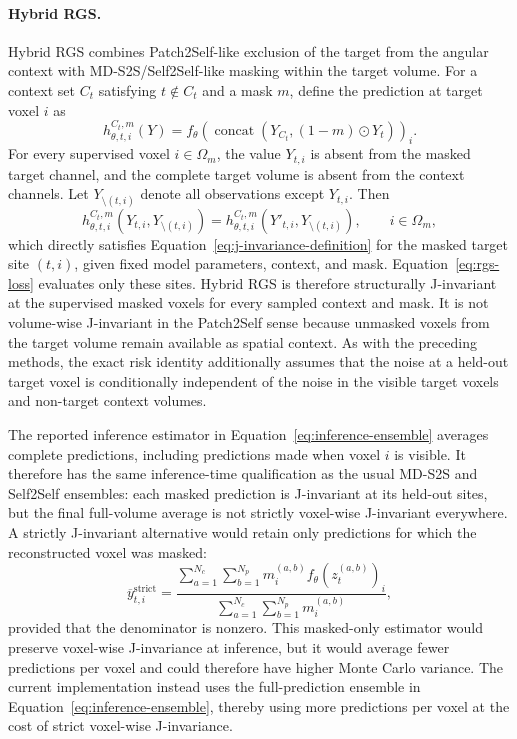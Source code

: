 \documentclass[preprint,12pt]{elsarticle}
\begin{document}
\paragraph{Hybrid RGS.}
Hybrid RGS combines Patch2Self-like exclusion of the target from the angular context with MD-S2S/Self2Self-like masking within the target volume. For a context set $C_t$ satisfying $t\notin C_t$ and a mask $m$, define the prediction at target voxel $i$ as
\begin{equation}
  h_{\theta,t,i}^{C_t,m}(Y)
  =
  f_\theta\!\left(
    \operatorname{concat}\!\left(Y_{C_t},(1-m)\odot Y_t\right)
  \right)_i.
  \label{eq:hybrid-site-prediction}
\end{equation}
For every supervised voxel $i\in\Omega_m$, the value $Y_{t,i}$ is absent from the masked target channel, and the complete target volume is absent from the context channels. Let $Y_{\setminus(t,i)}$ denote all observations except $Y_{t,i}$. Then
\begin{equation}
  h_{\theta,t,i}^{C_t,m}(Y_{t,i},Y_{\setminus(t,i)})
  =
  h_{\theta,t,i}^{C_t,m}(Y'_{t,i},Y_{\setminus(t,i)}),
  \qquad i\in\Omega_m,
  \label{eq:hybrid-j-invariance}
\end{equation}
which directly satisfies Equation~\eqref{eq:j-invariance-definition} for the masked target site $(t,i)$, given fixed model parameters, context, and mask. Equation~\eqref{eq:rgs-loss} evaluates only these sites. Hybrid RGS is therefore structurally J-invariant at the supervised masked voxels for every sampled context and mask. It is not volume-wise J-invariant in the Patch2Self sense because unmasked voxels from the target volume remain available as spatial context. As with the preceding methods, the exact risk identity additionally assumes that the noise at a held-out target voxel is conditionally independent of the noise in the visible target voxels and non-target context volumes.

The reported inference estimator in Equation~\eqref{eq:inference-ensemble} averages complete predictions, including predictions made when voxel $i$ is visible. It therefore has the same inference-time qualification as the usual MD-S2S and Self2Self ensembles: each masked prediction is J-invariant at its held-out sites, but the final full-volume average is not strictly voxel-wise J-invariant everywhere. A strictly J-invariant alternative would retain only predictions for which the reconstructed voxel was masked:
\begin{equation}
  \overline{y}^{\mathrm{strict}}_{t,i}
  =
  \frac{
    \displaystyle\sum_{a=1}^{N_c}\sum_{b=1}^{N_p}
    m_i^{(a,b)} f_\theta\!\left(z_t^{(a,b)}\right)_i
  }{
    \displaystyle\sum_{a=1}^{N_c}\sum_{b=1}^{N_p}m_i^{(a,b)}
  },
  \label{eq:strict-masked-inference}
\end{equation}
provided that the denominator is nonzero. This masked-only estimator would preserve voxel-wise J-invariance at inference, but it would average fewer predictions per voxel and could therefore have higher Monte Carlo variance. The current implementation instead uses the full-prediction ensemble in Equation~\eqref{eq:inference-ensemble}, thereby using more predictions per voxel at the cost of strict voxel-wise J-invariance.
\end{document}
